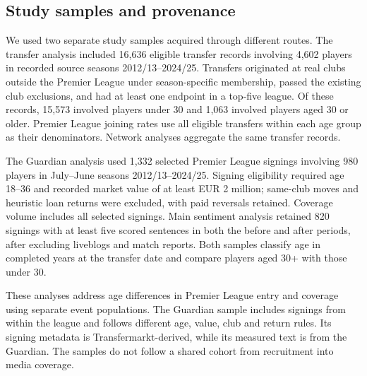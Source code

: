 \subsection*{Study samples and provenance}

We used two separate study samples acquired through different routes. The transfer analysis included 16,636 eligible transfer records involving 4,602 players in recorded source seasons 2012/13--2024/25. Transfers originated at real clubs outside the Premier League under season-specific membership, passed the existing club exclusions, and had at least one endpoint in a top-five league. Of these records, 15,573 involved players under 30 and 1,063 involved players aged 30 or older. Premier League joining rates use all eligible transfers within each age group as their denominators. Network analyses aggregate the same transfer records.

The Guardian analysis used 1,332 selected Premier League signings involving 980 players in July--June seasons 2012/13--2024/25. Signing eligibility required age 18--36 and recorded market value of at least EUR 2 million; same-club moves and heuristic loan returns were excluded, with paid reversals retained. Coverage volume includes all selected signings. Main sentiment analysis retained 820 signings with at least five scored sentences in both the before and after periods, after excluding liveblogs and match reports. Both samples classify age in completed years at the transfer date and compare players aged 30+ with those under 30.

These analyses address age differences in Premier League entry and coverage using separate event populations. The Guardian sample includes signings from within the league and follows different age, value, club and return rules. Its signing metadata is Transfermarkt-derived, while its measured text is from the Guardian. The samples do not follow a shared cohort from recruitment into media coverage.

